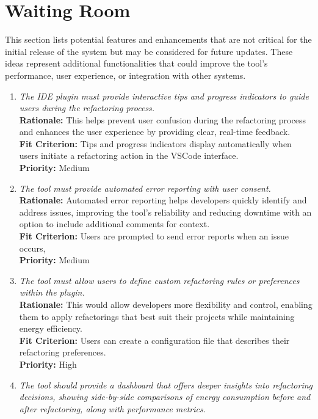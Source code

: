 \documentclass[12pt]{article}
\begin{document}
\section{Waiting Room}

This section lists potential features and enhancements that are not critical for the initial release of the system but may be considered for future updates. These ideas represent additional functionalities that could improve the tool’s performance, user experience, or integration with other systems.

\begin{enumerate}[label=WTRM \arabic*., wide=0pt, leftmargin=*]
	\item \emph{The IDE plugin must provide interactive tips and progress indicators to guide users during the refactoring process.}\\[2mm]
    {\bf Rationale:} This helps prevent user confusion during the refactoring process and enhances the user experience by providing clear, real-time feedback.\\
    {\bf Fit Criterion:} Tips and progress indicators display automatically when users initiate a refactoring action in the VSCode interface.\\
    {\bf Priority:} Medium
  \item \emph{The tool must provide automated error reporting with user consent.}\\[2mm]
    {\bf Rationale:} Automated error reporting helps developers quickly identify and address issues, improving the tool's reliability and reducing downtime with an option to include additional comments for context.\\
    {\bf Fit Criterion:} Users are prompted to send error reports when an issue occurs, \\
    {\bf Priority:} Medium
  \item \emph{The tool must allow users to define custom refactoring rules or preferences within the plugin.}\\[2mm]
    {\bf Rationale:} This would allow developers more flexibility and control, enabling them to apply refactorings that best suit their projects while maintaining energy efficiency.\\
    {\bf Fit Criterion:} Users can create a configuration file that describes their refactoring preferences.\\
    {\bf Priority:} High
  \item \emph{The tool should provide a dashboard that offers deeper insights into refactoring decisions, showing side-by-side comparisons of energy consumption before and after refactoring, along with performance metrics.}\\[2mm]

\end{enumerate}
\end{document}
